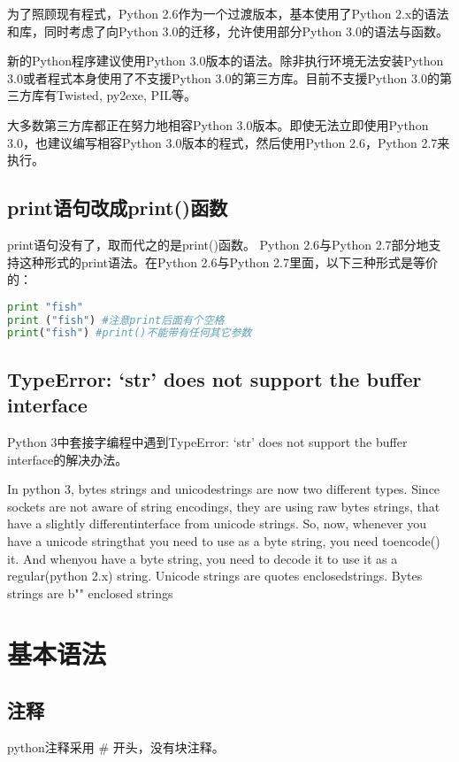 为了照顾现有程式，Python 2.6作为一个过渡版本，基本使用了Python 2.x的语法和库，同时考虑了向Python 3.0的迁移，允许使用部分Python 3.0的语法与函数。

新的Python程序建议使用Python 3.0版本的语法。除非执行环境无法安装Python 3.0或者程式本身使用了不支援Python 3.0的第三方库。目前不支援Python 3.0的第三方库有Twisted, py2exe, PIL等。

大多数第三方库都正在努力地相容Python 3.0版本。即使无法立即使用Python 3.0，也建议编写相容Python 3.0版本的程式，然后使用Python 2.6，Python 2.7来执行。


\subsection{print语句改成print()函数}
print语句没有了，取而代之的是print()函数。 Python 2.6与Python 2.7部分地支持这种形式的print语法。在Python 2.6与Python 2.7里面，以下三种形式是等价的：
\begin{lstlisting}[language=Python]
print "fish"
print ("fish") #注意print后面有个空格
print("fish") #print()不能带有任何其它参数
\end{lstlisting}



\subsection{TypeError: `str' does not support the buffer interface}
 Python 3中套接字编程中遇到TypeError: `str' does not support the buffer interface的解决办法。

In python 3, bytes strings and unicodestrings are now two different types. Since sockets are not aware of string encodings, they are using raw bytes strings, that have a slightly differentinterface from unicode strings.
So, now, whenever you have a unicode stringthat you need to use as a byte string, you need toencode() it. And whenyou have a byte string, you need to decode it to use it as a regular(python 2.x) string.
Unicode strings are quotes enclosedstrings. Bytes strings are b"" enclosed strings




\section{基本语法}
\subsection{注释}
python注释采用 \# 开头，没有块注释。



